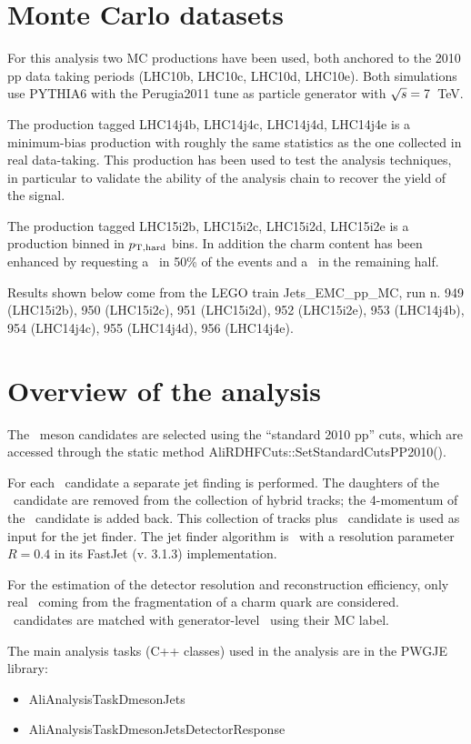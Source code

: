 \section{Monte Carlo datasets}
For this analysis two MC productions have been used, both anchored to the 2010 pp data taking periods (LHC10b, LHC10c, LHC10d, LHC10e).
Both simulations use PYTHIA6 with the Perugia2011 tune as particle generator with $\sqrt{s}=7$~TeV.

The production tagged LHC14j4b, LHC14j4c, LHC14j4d, LHC14j4e is a minimum-bias production with roughly the same statistics as the one collected in real data-taking.
This production has been used to test the analysis techniques, in particular to validate the ability of the analysis chain to recover the yield of the signal.

The production tagged LHC15i2b, LHC15i2c, LHC15i2d, LHC15i2e is a production binned in $p_{\rm T,hard}$ bins.
In addition the charm content has been enhanced by requesting a \ccbar\ in 50\% of the events and a \bbbar\ in the remaining half.

Results shown below come from the LEGO train Jets\_EMC\_pp\_MC, run n. 949 (LHC15i2b), 950 (LHC15i2c), 951 (LHC15i2d), 952 (LHC15i2e), 953 (LHC14j4b), 954 (LHC14j4c), 955 (LHC14j4d), 956 (LHC14j4e).
\section{Overview of the analysis}
The \Dzero\ meson candidates are selected using the ``standard 2010 pp'' cuts, which are accessed through the static method AliRDHFCuts::SetStandardCutsPP2010().

For each \Dzero\ candidate a separate jet finding is performed. The daughters of the \Dzero\ candidate are 
removed from the collection of hybrid tracks; the 4-momentum of the \Dzero\ candidate is added back. 
This collection of tracks plus \Dzero\ candidate is used as input for the jet finder.
The jet finder algorithm is \antikt\ with a resolution parameter $R=0.4$ in its FastJet (v. 3.1.3) implementation.

For the estimation of the detector resolution and reconstruction efficiency, only real \Dzero\ coming from
the fragmentation of a charm quark are considered. \Dzero\ candidates are matched with generator-level \Dzero\ using their MC label.

The main analysis tasks (C++ classes) used in the analysis are in the PWGJE library:
\begin{itemize}
\item AliAnalysisTaskDmesonJets
\item AliAnalysisTaskDmesonJetsDetectorResponse
\end{itemize}
